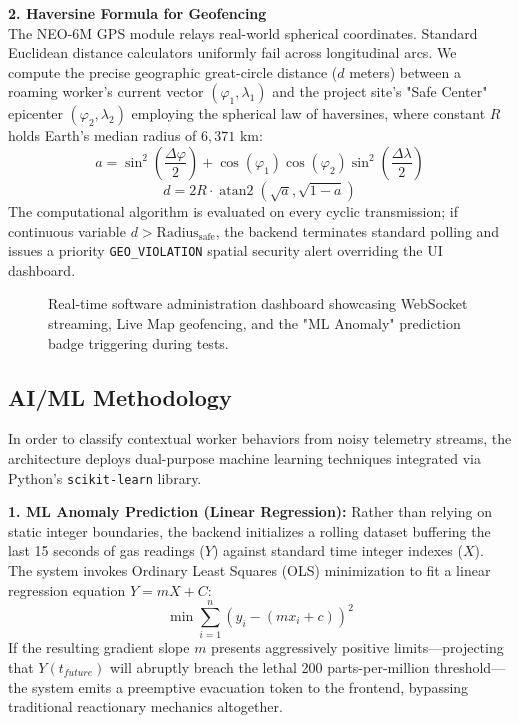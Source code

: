 \documentclass[11pt, conference, a4paper]{IEEEtran}
\begin{document}
\textbf{2. Haversine Formula for Geofencing} \\
The NEO-6M GPS module relays real-world spherical coordinates. Standard Euclidean distance calculators uniformly fail across longitudinal arcs. We compute the precise geographic great-circle distance ($d$ meters) between a roaming worker's current vector $(\varphi_1, \lambda_1)$ and the project site's "Safe Center" epicenter $(\varphi_2, \lambda_2)$ employing the spherical law of haversines, where constant $R$ holds Earth's median radius of $6,371$ km:
\begin{equation}
a = \sin^2\left(\frac{\Delta \varphi}{2}\right) + \cos(\varphi_1) \cos(\varphi_2) \sin^2\left(\frac{\Delta \lambda}{2}\right)
\end{equation}
\begin{equation}
d = 2 R \cdot \operatorname{atan2}\left(\sqrt{a}, \sqrt{1 - a}\right)
\end{equation}
The computational algorithm is evaluated on every cyclic transmission; if continuous variable $d > \text{Radius}_\text{safe}$, the backend terminates standard polling and issues a priority \texttt{GEO\_VIOLATION} spatial security alert overriding the UI dashboard.

\begin{figure}[ht]
\centering
\fbox{\rule{0pt}{2.5in} \rule{0.85\columnwidth}{0pt}}
\caption{Real-time software administration dashboard showcasing WebSocket streaming, Live Map geofencing, and the "ML Anomaly" prediction badge triggering during tests.}
\label{fig:experiment-dashboard}
\end{figure}

\subsection{AI/ML Methodology}
In order to classify contextual worker behaviors from noisy telemetry streams, the architecture deploys dual-purpose machine learning techniques integrated via Python's \texttt{scikit-learn} library.

\textbf{1. ML Anomaly Prediction (Linear Regression):} 
Rather than relying on static integer boundaries, the backend initializes a rolling dataset buffering the last 15 seconds of gas readings ($Y$) against standard time integer indexes ($X$). The system invokes Ordinary Least Squares (OLS) minimization to fit a linear regression equation $Y = mX + C$:
\begin{equation}
\min \sum_{i=1}^{n} \left( y_i - (mx_i + c) \right)^2
\end{equation}
If the resulting gradient slope $m$ presents aggressively positive limits—projecting that $Y(t_{future})$ will abruptly breach the lethal 200 parts-per-million threshold—the system emits a preemptive evacuation token to the frontend, bypassing traditional reactionary mechanics altogether.
\end{document}
